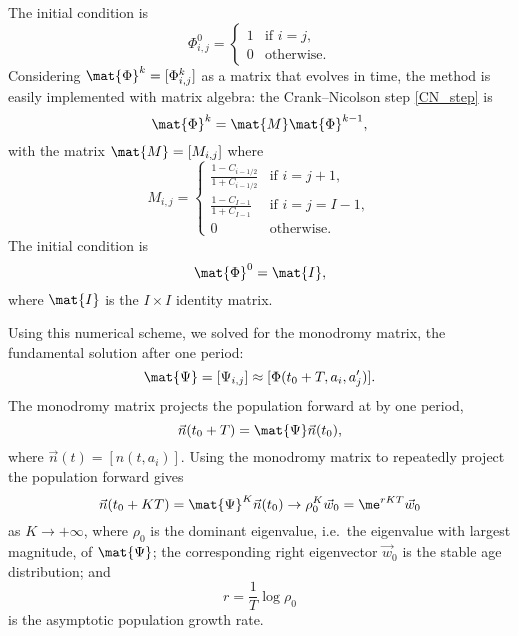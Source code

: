\documentclass{jpmarticle}
\begin{document}
The initial condition is
\begin{equation}
  \Phi_{i, j}^0 =
  \begin{cases}
    1 & \text{if $i = j$}, \\
    0 & \text{otherwise}.
  \end{cases}
\end{equation}
Considering $\mat{\Phi}^k = [\Phi_{i, j}^k]$ as a matrix that
evolves in time, the method is easily implemented with matrix algebra:
the Crank--Nicolson step \eqref{CN_step} is
\begin{equation}
  \mat{\Phi}^k = \mat{M} \mat{\Phi}^{k - 1},
\end{equation}
with the matrix $\mat{M} = [M_{i, j}]$ where
\begin{equation}
  M_{i, j} =
  \begin{cases}
    \frac{1 - C_{i - 1 / 2}}{1 + C_{i - 1 / 2}}
    & \text{if $i = j + 1$}, \\
    \frac{1 - C_{I - 1}}{1 + C_{I - 1}} & \text{if $i = j = I - 1$}, \\
    0 & \text{otherwise}.
  \end{cases}
\end{equation}
The initial condition is
\begin{equation}
  \mat{\Phi}^0 = \mat{I},
\end{equation}
where $\mat{I}$ is the $I \times I$ identity matrix.

Using this numerical scheme, we solved for the monodromy matrix, the
fundamental solution after one period:
\begin{equation}
  \mat{\Psi} = [\Psi_{i, j}] \approx [\Phi(t_0 + T, a_i, a'_j)].
\end{equation}
The monodromy matrix projects the population forward at by one period,
\begin{equation}
  \vec{n}(t_0 + T) = \mat{\Psi} \vec{n}(t_0),
\end{equation}
where $\vec{n}(t) = [n(t, a_i)]$.
Using the monodromy matrix to repeatedly project the population
forward gives
\begin{equation}
  \vec{n}(t_0 + K T)
  = \mat{\Psi}^K \vec{n}(t_0)
  \to \rho_0^K \vec{w}_0
  = \me^{r K T} \vec{w}_0
\end{equation}
as $K \to +\infty$,
where $\rho_0$ is the dominant eigenvalue, i.e.~the eigenvalue with
largest magnitude, of $\mat{\Psi}$;
the corresponding right eigenvector $\vec{w}_0$ is the stable age
distribution; and
\begin{equation}
  r = \frac{1}{T} \log \rho_0
\end{equation}
is the asymptotic population growth rate.
\end{document}
